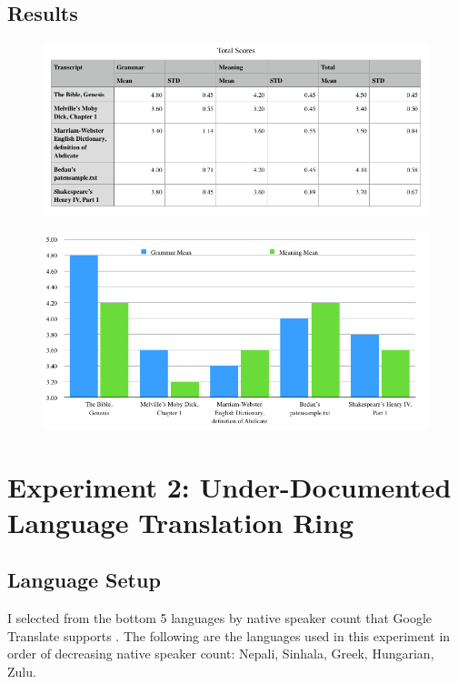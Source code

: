 \documentclass{article}
\begin{document}
\subsection{Results}
\begin{figure}[h]
\centering
\includegraphics[width=15cm,keepaspectratio]{images/exp1-results-table.png}
\end{figure}

\begin{figure}[h]
\centering
\includegraphics[width=15cm,keepaspectratio]{images/exp1-results-chart.png}
\end{figure}
\section{Experiment 2: Under-Documented Language Translation Ring}\subsection{Language Setup}


I selected from the bottom 5 languages by native speaker count that Google Translate supports . The following are the languages used in this experiment in order of decreasing native speaker count: Nepali, Sinhala, Greek, Hungarian, Zulu.
\end{document}
